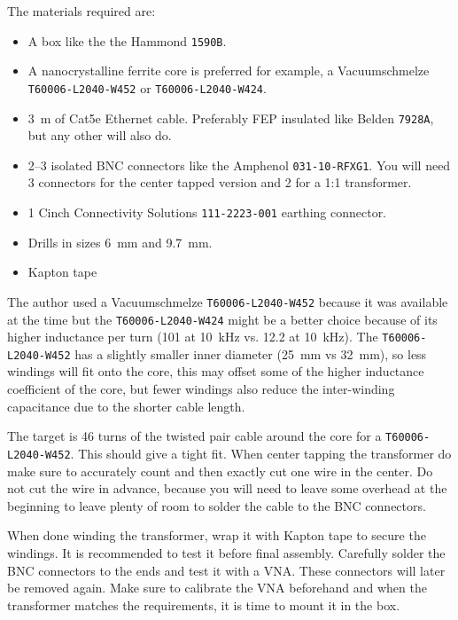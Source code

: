 \documentclass[12pt]{book}
\providecommand{\device}[1]{\texttt{\small #1}}
\begin{document}
The materials required are:

\begin{itemize}
    \itemsep0em
    \item A box like the the Hammond \device{1590B}.
    \item A nanocrystalline ferrite core is preferred for example, a Vacuumschmelze \device{T60006-L2040-W452} or \device{T60006-L2040-W424}.
    \item \qty{3}{\m} of Cat5e Ethernet cable. Preferably FEP insulated like Belden \device{7928A}, but any other will also do.
    \item \numrange{2}{3} isolated BNC connectors like the Amphenol \device{031-10-RFXG1}. You will need \num{3} connectors for the center tapped version and \num{2} for a 1:1 transformer.
    \item \num{1} Cinch Connectivity Solutions \device{111-2223-001} earthing connector.
    \item Drills in sizes \qty{6}{\mm} and \qty{9.7}{\mm}.
    \item Kapton tape
\end{itemize}

The author used a Vacuumschmelze \device{T60006-L2040-W452} because it was available at the time but the \device{T60006-L2040-W424} might be a better choice because of its higher inductance per turn (\qty{101}{\uH} at \qty{10}{\kHz} vs. \qty{12.2}{\uH} at \qty{10}{\kHz}). The \device{T60006-L2040-W452} has a slightly smaller inner diameter (\qty{25}{\mm} vs \qty{32}{\mm}), so less windings will fit onto the core, this may offset some of the higher inductance coefficient of the core, but fewer windings also reduce the inter-winding capacitance due to the shorter cable length.

The target is \num{46} turns of the twisted pair cable around the core for a \device{T60006-L2040-W452}. This should give a tight fit. When center tapping the transformer do make sure to accurately count and then exactly cut one wire in the center. Do not cut the wire in advance, because you will need to leave some overhead at the beginning to leave plenty of room to solder the cable to the BNC connectors.

When done winding the transformer, wrap it with Kapton tape to secure the windings. It is recommended to test it before final assembly. Carefully solder the BNC connectors to the ends and test it with a VNA. These connectors will later be removed again. Make sure to calibrate the VNA beforehand and when the transformer matches the requirements, it is time to mount it in the box.
\end{document}
